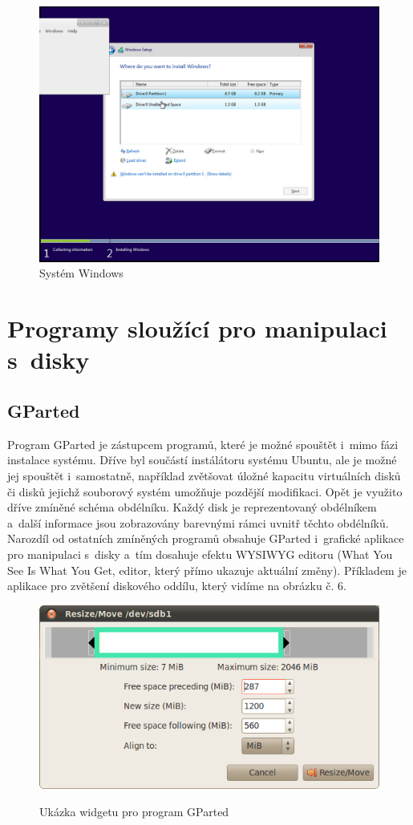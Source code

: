 \documentclass[a4paper,twosided]{article}
\begin{document}
\begin{figure}[h]
\label{fig:win}
\caption{Systém Windows}
\centering
\includegraphics[width=.8\columnwidth]{pics/win1.jpg}
\end{figure}

\section{Programy sloužící pro manipulaci s~disky}

\subsection{GParted}

Program GParted je zástupcem programů, které je možné spouštět i~mimo fázi instalace systému. Dříve byl součástí instálátoru systému Ubuntu, ale je možné jej spouštět i~samostatně, například 
 zvětšovat úložné kapacitu virtuálních disků či disků jejichž souborový systém umožňuje pozdější modifikaci. Opět je využito dříve zmíněné schéma obdélníku. Každý disk je reprezentovaný 
obdélníkem a~další informace jsou zobrazovány barevnými rámci uvnitř těchto obdélníků. Narozdíl od ostatních zmíněných programů obsahuje GParted i~grafické aplikace pro manipulaci s~disky 
a~tím dosahuje efektu WYSIWYG editoru (What You See Is What You Get, editor, který přímo ukazuje aktuální změny). Příkladem je aplikace pro zvětšení diskového oddílu, který vidíme na obrázku č. 6.

\begin{figure}[hb]
\label{fig:gparted}
\caption{Ukázka widgetu pro program GParted~\cite{GParted}}
\centering
\includegraphics[width=.8\columnwidth]{pics/gparted-5-big.png}\\
\end{figure}
\end{document}
